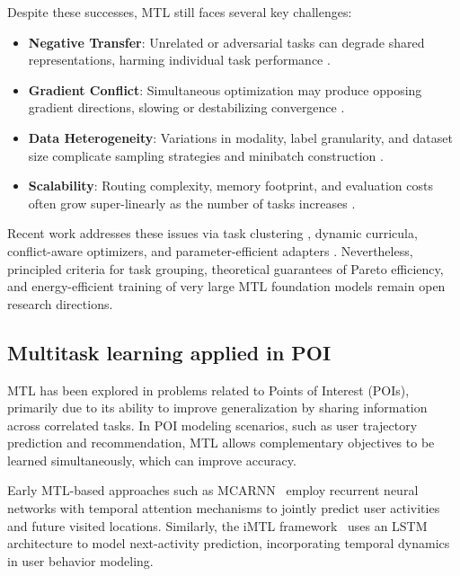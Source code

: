 Despite these successes, MTL still faces several key challenges:
\begin{itemize}
  \item \textbf{Negative Transfer}: Unrelated or adversarial tasks can degrade shared representations, harming individual task performance \cite{ruder2017sluice,zhang2021survey}.
  \item \textbf{Gradient Conflict}: Simultaneous optimization may produce opposing gradient directions, slowing or destabilizing convergence \cite{yu2020pcgrad,sener2018mgda}.
  \item \textbf{Data Heterogeneity}: Variations in modality, label granularity, and dataset size complicate sampling strategies and minibatch construction \cite{nash,standley2020tasks}.
  \item \textbf{Scalability}: Routing complexity, memory footprint, and evaluation costs often grow super-linearly as the number of tasks increases \cite{zhang2021survey,yu2024survey}.
\end{itemize}

Recent work addresses these issues via task clustering \cite{standley2020tasks}, dynamic curricula, conflict-aware optimizers, and parameter-efficient adapters \cite{yu2024survey}. Nevertheless, principled criteria for task grouping, theoretical guarantees of Pareto efficiency, and energy-efficient training of very large MTL foundation models remain open research directions.

\subsection{Multitask learning applied in POI}
MTL has been explored in problems related to Points of Interest (POIs), primarily due to its ability to improve generalization by sharing information across correlated tasks. In POI modeling scenarios, such as user trajectory prediction and recommendation, MTL allows complementary objectives to be learned simultaneously, which can improve accuracy.

Early MTL-based approaches such as MCARNN~\cite{Liao2018} employ recurrent neural networks with temporal attention mechanisms to jointly predict user activities and future visited locations. Similarly, the iMTL framework~\cite{Zhang2020} uses an LSTM architecture to model next-activity prediction, incorporating temporal dynamics in user behavior modeling.

